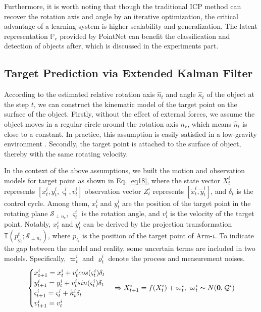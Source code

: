 \documentclass{article}
\begin{document}
Furthermore, it is worth noting that though the traditional ICP \cite{pomerleau2015review} method can recover the rotation axis and angle by an iterative optimization, the critical advantage of a learning system is higher scalability and generalization. The latent representation $\mathbb P_c $ provided by PointNet can benefit the classification and detection of objects after, which is discussed in the experiments part.




\subsection{Target Prediction via Extended Kalman Filter}

According to the estimated relative rotation axis $\hat{n}_t$ and angle  $ \hat{\kappa}_t$ of the object at the step $t$, we can construct the kinematic model of the target point on the surface of the object. Firstly, without the effect of external forces, we assume the object moves in a regular circle around the rotation axis $n_r$, which means $\hat{n}_t$ is close to a constant. In practice, this assumption is easily satisfied in a low-gravity environment \cite{li2021constrained}. Secondly, the target point is attached to the surface of object, thereby with the same rotating velocity. 

In the context of the above assumptions, we built the motion and observation models for target point as shown in Eq. \eqref{eq18}, where the state vector $ X^i_{t}$ represents $[x^i_t, y^i_t,\varsigma^i_t,v^i_t] $ observation vector $Z^i_t$ represents $[\widetilde{x}^i_t, \widetilde{y}^i_t]$, and $\delta_t$ is the control cycle. Among them, $x^i_t$ and $y^i_t$ are the position of the target point in the rotating plane $\mathcal S_{\perp n_r}$, $\varsigma^i_t$ is the rotation angle, and $v^i_t$ is the velocity of the target point. Notably, $x^i_t$ and $y^i_t$ can be derived by the projection transformation $\mathbb T (p^t_{g_i};\mathcal S_{\perp n_r})$, where $p_{t_i}$ is the position of the target point of Arm-$i$. To indicate the gap between the model and reality, some uncertain terms are included in two models. Specifically, $\varpi^i_t$ and $\varrho^i_t$ denote the process and measurement noises.
\begin{equation}
  \label{eq18}
\begin{split}
\begin{cases}
x^i_{t+1} = x^i_t+v^i_t cos(\varsigma^i_t) \delta_t \\
y^i_{t+1} = y^i_t+v^i_t sin(\varsigma^i_t) \delta_t \\
\varsigma^i_{t+1} = \varsigma^i_t + \dot{\hat{\kappa}}^i_t  \delta_t \\
v^i_{t+1} = v^i_t
\
\end{cases}
\Rightarrow X^i_{t+1} = f(X^i_t) + \varpi^i_t, \ \varpi^i_t \sim N(\textbf 0, \mathcal Q^i)  
\end{split}
\end{equation}
\end{document}
